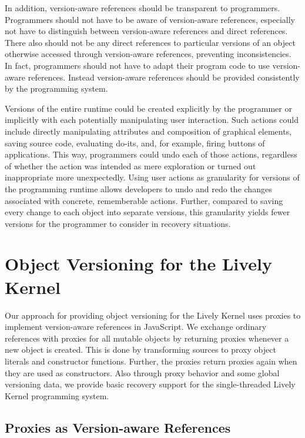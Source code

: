 In addition, version-aware references should be transparent to programmers.
Programmers should not have to be aware of version-aware references, especially not have to distinguish between version-aware references and direct references.
There also should not be any direct references to particular versions of an object otherwise accessed through version-aware references, preventing inconsistencies.
In fact, programmers should not have to adapt their program code to use version-aware references.
Instead version-aware references should be provided consistently by the programming system.

Versions of the entire runtime could be created explicitly by the programmer or implicitly with each potentially manipulating user interaction.
Such actions could include directly manipulating attributes and composition of graphical elements, saving source code, evaluating do-its, and, for example, firing buttons of applications.
This way, programmers could undo each of those actions, regardless of whether the action was intended as mere exploration or turned out inappropriate more unexpectedly.
Using user actions as granularity for versions of the programming runtime allows developers to undo and redo the changes associated with concrete, rememberable actions.
Further, compared to saving every change to each object into separate versions, this granularity yields fewer versions for the programmer to consider in recovery situations.



\section{Object Versioning for the Lively Kernel} \label{sec:APPROACH:2}

Our approach for providing object versioning for the Lively Kernel uses proxies to implement version-aware references in JavaScript.
We exchange ordinary references with proxies for all mutable objects by returning proxies whenever a new object is created.
This is done by transforming sources to proxy object literals and constructor functions.
Further, the proxies return proxies again when they are used as constructors.
Also through proxy behavior and some global versioning data, we provide basic recovery support for the single-threaded Lively Kernel programming system.


\subsection{Proxies as Version-aware References}


